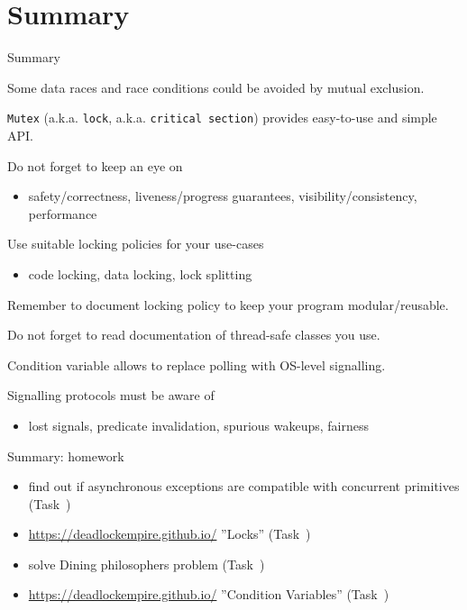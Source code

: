 \section{Summary}

\begin{frame}{Summary}

Some data races and race conditions could be avoided by mutual exclusion.

\texttt{Mutex} (a.k.a. \texttt{lock}, a.k.a. \texttt{critical section}) provides easy-to-use and simple API.

Do not forget to keep an eye on
\begin{itemize}
    \item safety/correctness, liveness/progress guarantees, visibility/consistency, performance
\end{itemize}

Use suitable locking policies for your use-cases
\begin{itemize}
    \item code locking, data locking, lock splitting
\end{itemize}

Remember to document locking policy to keep your program modular/reusable.

Do not forget to read documentation of thread-safe classes you use.

Condition variable allows to replace polling with OS-level signalling.

Signalling protocols must be aware of
\begin{itemize}
    \item lost signals, predicate invalidation, spurious wakeups, fairness
\end{itemize}
\end{frame}

\begin{frame}{Summary: homework}

\begin{itemize}
    \item find out if asynchronous exceptions are compatible with concurrent primitives (Task~\taskAsyncException)
    \item \url{https://deadlockempire.github.io/} ''Locks'' (Task~\taskEmpire)
    \item solve Dining philosophers problem (Task~\taskCodeDining)
    \item \url{https://deadlockempire.github.io/} ''Condition Variables'' (Task~\taskEmpireCond)
\end{itemize}
\end{frame}


